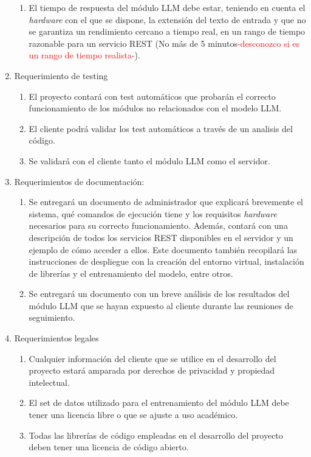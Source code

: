 \documentclass[
11pt, %
]{Clases/charter}
\begin{document}
\begin{enumerate}
\begin{enumerate}
		      \item El tiempo de respuesta del módulo LLM debe estar, teniendo en cuenta el \textit{hardware} con el que se dispone, la extensión del texto de entrada y que no se garantiza un rendimiento cercano a tiempo real,
		            en un rango de tiempo razonable para un servicio REST (No más de 5 minutos\textcolor{red}{-desconozco si es un rango de tiempo realista-}).
	      \end{enumerate}
	\item Requerimiento de testing
	      \begin{enumerate}
		      \item El proyecto contará con test automáticos que probarán el correcto funcionamiento de los módulos no relacionados con el modelo LLM.
		      \item El cliente podrá validar los test automáticos a través de un analisis del código.
		      \item Se validará con el cliente tanto el módulo LLM como el servidor.
	      \end{enumerate}
	\item Requerimientos de documentación:
	      \begin{enumerate}
		      \item Se entregará un documento de administrador que explicará brevemente el sistema, qué comandos de ejecución tiene y los requisitos \textit{hardware} necesarios para su correcto funcionamiento.
		            Además, contará con una descripción de todos los servicios REST disponibles en el servidor y un ejemplo de cómo acceder a ellos.
		            Este documento también recopilará las instrucciones de despliegue con la creación del entorno virtual, instalación de librerías y el entrenamiento del modelo, entre otros.
		      \item Se entregará un documento con un breve análisis de los resultados del módulo LLM que se hayan expuesto al cliente durante las reuniones de seguimiento.
	      \end{enumerate}
	\item Requerimientos legales
	      \begin{enumerate}
		      \item Cualquier información del cliente que se utilice en el desarrollo del proyecto estará amparada por derechos de privacidad y propiedad intelectual.
		      \item El set de datos utilizado para el entrenamiento del módulo LLM debe tener una licencia libre o que se ajuste a uso académico.
		      \item Todas las librerías de código empleadas en el desarrollo del proyecto deben tener una licencia de código abierto.
	      \end{enumerate}
\end{enumerate}
\end{document}
